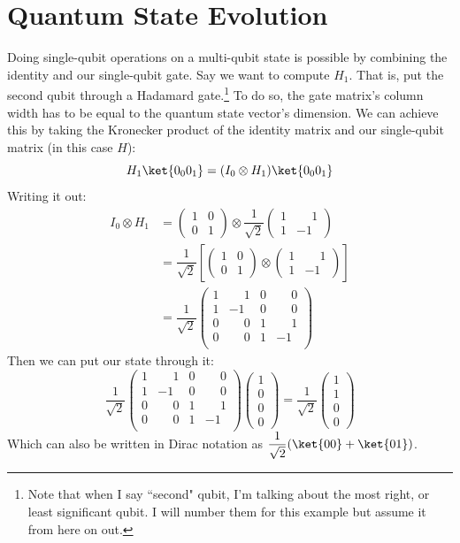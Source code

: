\documentclass[11pt, notitlepage]{report}
\newcommand{\igate}{
  \begin{pmatrix}
  1 & 0 \\
  0 & 1
  \end{pmatrix}
}
\newcommand{\hgate}{
  \dfrac{1}{\sqrt2}
  \begin{pmatrix}
  1 & \phantom{-}1 \\
  1 & -1
  \end{pmatrix}
}
\begin{document}
\section{Quantum State Evolution}
Doing single-qubit operations on a multi-qubit state is possible by combining the identity and our single-qubit gate. Say we want to compute $H_1$. That is, put the second qubit through a Hadamard gate.\footnote{Note that when I say ``second" qubit, I'm talking about the most right, or least significant qubit. I will number them for this example but assume it from here on out.} To do so, the gate matrix's column width has to be equal to the quantum state vector's dimension. We can achieve this by taking the Kronecker product of the identity matrix and our single-qubit matrix (in this case $H$):
\[
  H_1\ket{0_0 0_1} = (I_0 \otimes H_1)\ket{0_0 0_1}
\]
Writing it out:
\begin{align*}
  I_0 \otimes H_1 &=
  \igate{} \otimes \hgate{} \\
  &=
  \dfrac{1}{\sqrt2}
  \left[
  \igate{}
  \otimes
  \begin{pmatrix}
  1 & \phantom{-}1 \\
  1 & -1
  \end{pmatrix}
  \right] \\
  &= \dfrac{1}{\sqrt2}
  \begin{pmatrix}
  1 & \phantom{-}1 & 0 & \phantom{-}0 \\
  1 & -1 & 0 & \phantom{-}0 \\
  0 & \phantom{-}0 & 1 & \phantom{-}1 \\
  0 & \phantom{-}0 & 1 & -1 \\
  \end{pmatrix}
\end{align*}
Then we can put our  state through it:
\[
  \dfrac{1}{\sqrt2}
  \begin{pmatrix}
  1 & \phantom{-}1 & 0 & \phantom{-}0 \\
  1 & -1 & 0 & \phantom{-}0 \\
  0 & \phantom{-}0 & 1 & \phantom{-}1 \\
  0 & \phantom{-}0 & 1 & -1 \\
  \end{pmatrix}
  \begin{pmatrix}
  1 \\
  0 \\
  0 \\
  0
  \end{pmatrix}
  =
  \dfrac{1}{\sqrt2}
  \begin{pmatrix}
  1 \\
  1 \\
  0 \\
  0
  \end{pmatrix}
\]
Which can also be written in Dirac notation as $\dfrac{1}{\sqrt2}(\ket{00} + \ket{01})$.
\end{document}
